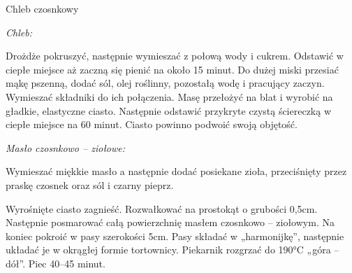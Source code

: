 \documentclass[a4paper,12pt]{article}
\begin{document}
\begin{recipe}{Chleb czosnkowy}{}{}

\freeform%

\begin{center}
\textit{Chleb:}
\end{center}

Drożdże pokruszyć, następnie wymieszać z połową wody i cukrem.
Odstawić w ciepłe miejsce aż zaczną się pienić na około 15 minut.
Do dużej miski przesiać mąkę pszenną, dodać sól, olej roślinny, pozostałą wodę i pracujący zaczyn.
\freeform%
Wymieszać składniki do ich połączenia.
Masę przełożyć na blat i wyrobić na gładkie, elastyczne ciasto.
Następnie odstawić przykryte czystą ściereczką w ciepłe miejsce na 60 minut.
Ciasto powinno podwoić swoją objętość.

\freeform%
\begin{center}
\textit{Masło czosnkowo – ziołowe:}
\end{center}
Wymieszać miękkie masło a następnie dodać posiekane zioła, przeciśnięty przez praskę czosnek oraz sól i czarny pieprz.

\freeform%
Wyrośnięte ciasto zagnieść.
Rozwałkować na prostokąt o grubości 0,5cm.
Następnie posmarować całą powierzchnię masłem czosnkowo – ziołowym. 
Na koniec pokroić w pasy szerokości 5cm.
Pasy składać w „harmonijkę”, następnie układać je w okrągłej formie tortownicy.
Piekarnik rozgrzać do 190°C „góra – dół”.
Piec 40--45 minut.
\end{recipe}

\newpage
\end{document}

